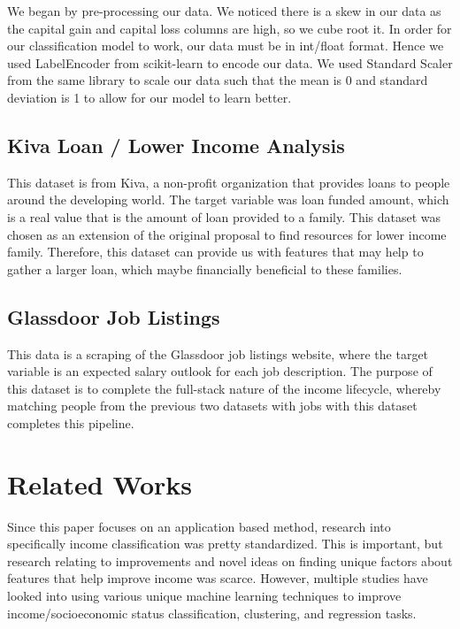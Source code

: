 \documentclass{article}
\begin{document}
We began by pre-processing our data. We noticed there is a skew in our data as the capital gain and capital loss columns are high, so we cube root it. In order for our classification model to work, our data must be in int/float format. Hence we used LabelEncoder from scikit-learn to encode our data. We used Standard Scaler from the same library to scale our data such that the mean is 0 and standard deviation is 1 to allow for our model to learn better.


\subsection{Kiva Loan / Lower Income Analysis}

This dataset is from Kiva, a non-profit organization that provides loans to people around the developing world. The target variable was loan funded amount, which is a real value that is the amount of loan provided to a family. This dataset was chosen as an extension of the original proposal to find resources for lower income family. Therefore, this dataset can provide us with features that may help to gather a larger loan, which maybe financially beneficial to these families.

\subsection{Glassdoor Job Listings}

This data is a scraping of the Glassdoor job listings website, where the target variable is an expected salary outlook for each job description. The purpose of this dataset is to complete the full-stack nature of the income lifecycle, whereby matching people from the previous two datasets with jobs with this dataset completes this pipeline. 

\section{Related Works}

Since this paper focuses on an application based method, research into specifically income classification was pretty standardized. This is important, but research relating to improvements and novel ideas on finding unique factors about features that help improve income was scarce. However, multiple studies have looked into using various unique machine learning techniques to improve income/socioeconomic status classification, clustering, and regression tasks. 
\end{document}
